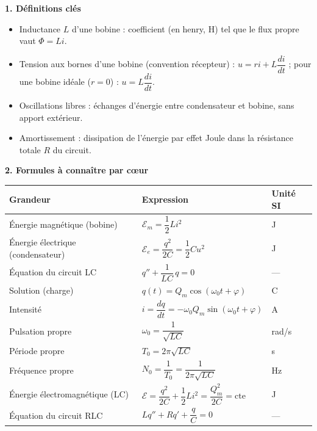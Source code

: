 \documentclass[11pt]{article}
\newcommand{\cle}[1]{{\popxbold\color{popdark}#1}}
\begin{document}
\begin{bilan}
\textbf{1. Définitions clés}
\begin{itemize}
  \item \cle{Inductance} $L$ d'une bobine : coefficient (en henry, H) tel que le flux propre vaut $\Phi = Li$.
  \item \cle{Tension aux bornes d'une bobine} (convention récepteur) : $u = ri + L\dfrac{di}{dt}$ ; pour une bobine idéale ($r=0$) : $u = L\dfrac{di}{dt}$.
  \item \cle{Oscillations libres} : échanges d'énergie entre condensateur et bobine, sans apport extérieur.
  \item \cle{Amortissement} : dissipation de l'énergie par effet Joule dans la résistance totale $R$ du circuit.
\end{itemize}

\textbf{2. Formules à connaître par c\oe ur}
\begin{center}
\begin{tabularx}{\linewidth}{|l|X|l|}
\hline
\rowcolor{popblueL} \textbf{Grandeur} & \textbf{Expression} & \textbf{Unité SI} \\
\hline
Énergie magnétique (bobine) & $\mathcal{E}_m = \dfrac{1}{2}Li^2$ & J \\
\hline
Énergie électrique (condensateur) & $\mathcal{E}_e = \dfrac{q^2}{2C} = \dfrac{1}{2}Cu^2$ & J \\
\hline
Équation du circuit LC & $q'' + \dfrac{1}{LC}\,q = 0$ & --- \\
\hline
Solution (charge) & $q(t) = Q_m\cos(\omega_0 t + \varphi)$ & C \\
\hline
Intensité & $i = \dfrac{dq}{dt} = -\omega_0 Q_m\sin(\omega_0 t+\varphi)$ & A \\
\hline
Pulsation propre & $\omega_0 = \dfrac{1}{\sqrt{LC}}$ & rad/s \\
\hline
Période propre & $T_0 = 2\pi\sqrt{LC}$ & s \\
\hline
Fréquence propre & $N_0 = \dfrac{1}{T_0} = \dfrac{1}{2\pi\sqrt{LC}}$ & Hz \\
\hline
Énergie électromagnétique (LC) & $\mathcal{E} = \dfrac{q^2}{2C} + \dfrac{1}{2}Li^2 = \dfrac{Q_m^2}{2C} = \text{cte}$ & J \\
\hline
Équation du circuit RLC & $Lq'' + Rq' + \dfrac{q}{C} = 0$ & --- \\
\hline
\end{tabularx}
\end{center}


\end{bilan}
\end{document}
